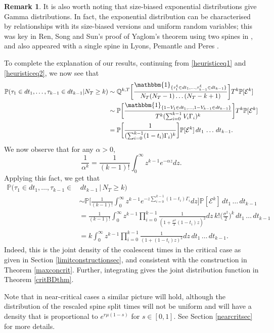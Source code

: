 \documentclass{article}
\theoremstyle{plain}
\theoremstyle{definition}
\newtheorem*{rmk}{Remark}
\newcommand{\Q}{\mathbb{Q}}
\renewcommand{\P}{\mathbb{P}}
\newcommand{\ind}{\mathbbm{1}}
\begin{document}
\begin{rmk}
It is also worth noting that size-biased exponential distributions give Gamma distributions. In fact, the exponential distribution can be characterised by relationships with its size-biased versions and uniform random variables; this was key in Ren, Song and Sun's proof of Yaglom's theorem using two spines in \cite{ren_song_sun:2spineGW}, and also appeared with a single spine in Lyons, Pemantle and Peres \cite{lyons_et_al:conceptual_llogl_mean_behaviour_bps}.
\end{rmk}


To complete the explanation of our results, continuing from \eqref{heuristiceq1} and \eqref{heuristiceq2}, we  now see that 
\begin{align*}
\P(\tau_1\in dt_1, \ldots, \tau_{k-1}\in dt_{k-1} | N_T \ge k) &\sim \Q^{k,T}\bigg[ \frac{\ind_{\{\tau_1^{\xi} \in dt_1, \ldots, \tau_{k-1}^\xi\in dt_{k-1}\}}}{N_T (N_T-1)\ldots (N_T-k+1)} \bigg] T^k \P[\mathcal E^k]\\
&\sim \P\bigg[ \frac{\ind_{\{1-V_1\in dt_1, \ldots, 1-V_{k-1}\in dt_{k-1}\}}}{T^k (\sum_{i=0}^{k-1} V_i \Gamma_i)^k} \bigg] T^k \P[\mathcal E^k]\\
&= \P\bigg[ \frac{1}{(\sum_{i=0}^{k-1} (1-t_i) \Gamma_i)^k}\bigg] \P[\mathcal E^k] \,dt_1\,\ldots\,dt_{k-1}.
\end{align*}
We now observe that for any $\alpha>0$,
\[\frac{1}{\alpha^k} = \frac{1}{(k-1)!} \int_0^\infty z^{k-1} e^{-\alpha z} dz.\]
Applying this fact, we get that 
\begin{align*}
\P(\tau_1\in dt_1, \ldots, \tau_{k-1}\in &\, dt_{k-1} \,|\, N_T \ge k)\\
&\sim \P\Big[\frac{1}{(k-1)!} \int_0^\infty z^{k-1}e^{-z \sum_{i=0}^{k-1} (1-t_i)\Gamma_i} dz \Big]\P[\mathcal E^k] \,dt_1\,\ldots\,dt_{k-1}\\
&= \frac{1}{(k-1)!} \int_0^\infty z^{k-1}\prod_{i=0}^{k-1} \frac{1}{(1+\frac{\sigma^2}{2}(1-t_i)z)^2} dz\,k!\Big(\frac{\sigma^2}{2}\Big)^k \,dt_1\,\ldots\,dt_{k-1}\\
&= k \int_0^\infty z^{k-1}\prod_{i=0}^{k-1} \frac{1}{(1+(1-t_i)z)^2} dz\,dt_1\,\ldots\,dt_{k-1}.
\end{align*}
Indeed, this is the joint density of the coalescent times in the critical case as given in Section \ref{limitconstructionsec}, and consistent with the construction in Theorem \ref{maxconcrit}. Further, integrating gives the joint distribution function in Theorem \ref{critBDthm}.


Note that in near-critical cases a similar picture will hold, although the distribution of the rescaled spine split times will not be uniform and will have a density that is proportional to $e^{r\mu(1-s)}$ for $s\in[0,1]$. See Section \ref{nearcritsec} for more details.
\end{document}
